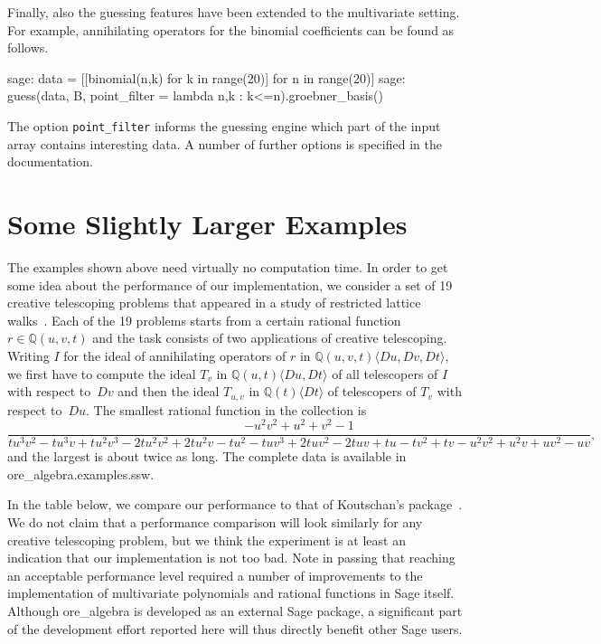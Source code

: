 \documentclass[11pt]{article}
\def\<#1>{\langle#1\rangle}
\let\set\mathbb
\begin{document}
Finally, also the guessing features have been extended to the multivariate setting. For example, annihilating operators
for the binomial coefficients can be found as follows.
\begin{sageexample}
  sage: data = [[binomial(n,k) for k in range(20)] for n in range(20)]
  sage: guess(data, B, point_filter = lambda n,k : k<=n).groebner_basis()
\end{sageexample}
The option \verb|point_filter| informs the guessing engine which part of the input array contains interesting data.
A number of further options is specified in the documentation. 

\section{Some Slightly Larger Examples}

The examples shown above need virtually no computation time. In order to get some idea about the performance of our
implementation, we consider a set of 19 creative telescoping problems that appeared in a study of restricted lattice
walks~\cite{bostan16b}.
Each of the 19 problems starts from a certain rational function $r\in\set Q(u,v,t)$ and the task consists of two
applications of creative telescoping. Writing $I$ for the ideal of annihilating operators of $r$ in $\set Q(u,v,t)\<Du,Dv,Dt>$,
we first have to compute the ideal $T_v$ in $\set Q(u,t)\<Du,Dt>$ of all telescopers of $I$ with respect to~$Dv$ and then
the ideal $T_{u,v}$ in $\set Q(t)\<Dt>$ of telescopers of $T_v$ with respect to~$Du$. The smallest rational function in
the collection is
\[
\frac{{-}u^2 v^2{+}u^2{+}v^2{-}1}{t u^3 v^2{-}t u^3 v{+}t u^2 v^3{-}2 t u^2 v^2{+}2 t u^2 v{-}t u^2{-}t u v^3{+}2 t u v^2{-}2 t
  u v{+}t u{-}t v^2{+}t v{-}u^2 v^2{+}u^2 v{+}u v^2{-}u v},
\]
and the largest is about twice as long. The complete data is available in ore\_algebra.examples.ssw.

In the table below, we compare our performance to that of Koutschan's package~\cite{koutschan10c}. We do not claim that a
performance comparison will look similarly for any creative telescoping problem, but we think the experiment is at least
an indication that our implementation is not too bad.
Note in passing that reaching an acceptable performance level required a number of improvements to
the implementation of multivariate polynomials and rational functions in Sage itself.
Although ore\_algebra is developed as an external Sage package, a significant part of the
development effort reported here will thus directly benefit other Sage users.
\end{document}
